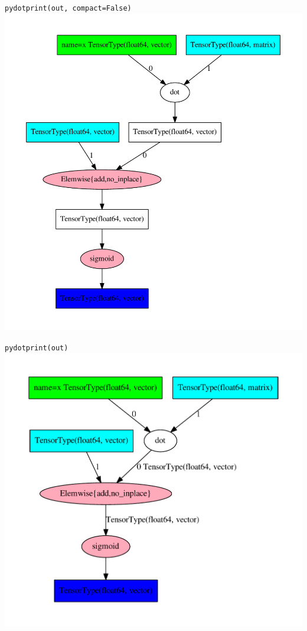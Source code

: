 \documentclass[a4paper,9pt]{beamer}
\begin{document}
\begin{frame}{\texttt{pydotprint(out, compact=False)}}
    \center
    \includegraphics[height=0.9\textheight]{pydotprint_out_long.pdf}
\end{frame}

\begin{frame}{\texttt{pydotprint(out)}}
    \center
    \includegraphics[height=0.9\textheight]{pydotprint_out.pdf}
\end{frame}
\end{document}
